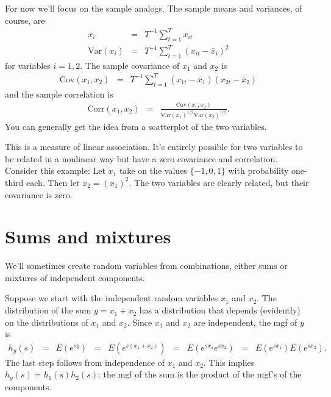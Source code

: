 \documentclass[11pt]{article}
\begin{document}
For now we'll focus on the sample analogs.
The sample means and variances, of course, are
\begin{eqnarray*}
    \bar{x}_i &=& T^{-1} \sum_{t=1}^T x_{it} \\
    \mbox{Var} (x_i) &=& T^{-1}
            \sum_{t=1}^T (x_{it} - \bar{x}_i)^2
\end{eqnarray*}
for variables $i=1,2$.
The sample covariance of $x_1$ and $x_2$ is
\begin{eqnarray*}
    \mbox{Cov} (x_1,x_2) &=& T^{-1}
            \sum_{t=1}^T (x_{1t} - \bar{x}_1) (x_{2t} - \bar{x}_2)
\end{eqnarray*}
and the sample correlation is
\begin{eqnarray*}
    \mbox{Corr}(x_1,x_2) &=&
            \frac {\mbox{Cov}(x_1,x_2)} {\mbox{Var}(x_1)^{1/2} \mbox{Var}(x_2)^{1/2} } .
\end{eqnarray*}
You can generally get the idea from a scatterplot of the two variables.


This is a measure of linear association.
It's entirely possible for two variables to be related
in a nonlinear way but have a zero covariance and correlation.
Consider this example:
Let $x_1$ take on the values $\{-1,0,1\}$ with probability one-third each.
Then let $x_2 = (x_1)^2$.
The two variables are clearly related, but their covariance is zero.


\section{Sums and mixtures}

We'll sometimes create random variables from combinations, either
sums or mixtures of independent components.  

Suppose we start with the independent random variables $x_1$ and $x_2$.
The distribution of the sum $y = x_1+x_2$ 
has a distribution that depends (evidently) on the distributions of $x_1$ and $x_2$.
Since $x_1$ and $x_2$ are independent, 
the mgf of $y$ is   
\begin{eqnarray*}
    h_y(s) &=& E \left( e^{sy} \right)
            \;\;=\;\; E \left( e^{s(x_1+x_2)} \right)
            \;\;=\;\; E \left( e^{s x_1} e^{s x_2} \right)
            \;\;=\;\; E \left( e^{s x_1}\right) E \left( e^{s x_2} \right) .
\end{eqnarray*}
The last step follows from independence of $x_1$ and $x_2$.  
This implies $h_y(s) = h_1(s) h_2(s)$:  the mgf of the sum 
is the product of the mgf's of the components.  
\end{document}
